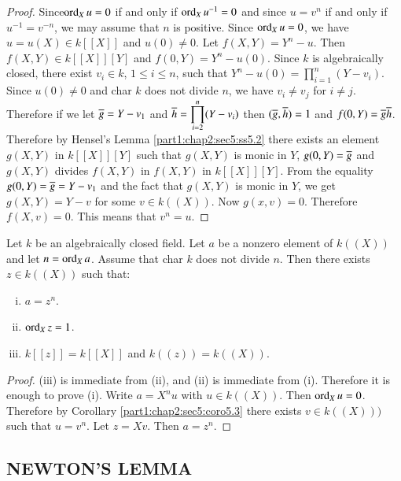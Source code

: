 \begin{proof}
  Since\pageoriginale $\operatorname{ord}_X u =0$ if and only if $\operatorname{ord}_X u^{-1}=0$ and since $u= v^n$ if and only if $u^{-1} = v^{-n}$, we may assume that $n$ is positive. Since $\operatorname{ord}_X u=0$, we have $u = u(X) \in k [[X]]$ and $u (0) \neq 0$. Let $f(X, Y) = Y^n-u$. Then $f(X, Y) \in k [[X]][Y]$ and $f (0, Y)= Y^n- u(0)$. Since $k$ is algebraically closed, there exist $v_i \in k$, $1 \leq i \leq n$, such that $\displaystyle{Y^n - u(0)=\prod^n_{i=1} (Y- v_i)}$. Since $u(0) \neq 0$ and char $k$ does not divide $n$, we have $v_i \neq v_j$ for $i \neq j$. Therefore if we let $\overline{g} = Y -v_1$ and $\overline{h} = \displaystyle{\prod^n_{i=2} (Y- v_i)}$ then \gcd $(\overline{g}, \overline{h})=1$ and $f(0, Y)= \overline{g} \overline{h}$. Therefore by Hensel's Lemma \ref{part1:chap2:sec5:ss5.2} there exists an element $g(X, Y)$  in $k [[X]] [Y]$ such that $g (X, Y)$ is monic in $Y$, $g (0 , Y) = \overline{g}$ and $g(X, Y)$ divides $f(X, Y)$ in $f (X, Y)$ in $k [[X]] [Y]$. From the equality $g (0 , Y)= \overline{g} = Y- v_1$ and the fact that $g(X, Y)$ is monic in $Y$, we get $g(X, Y)= Y - v$ for some $v \in k ((X))$. Now $g(x, v)=0$. Therefore $f(X, v)=0$. This means that $v^n =u$.
\end{proof}

\begin{coro}\label{part1:chap2:sec5:coro5.4}
  Let $k$ be an algebraically closed field. Let $a$ be a nonzero element of $k((X))$ and let $n= \operatorname{ord}_X a$. Assume that char $k$ does not divide $n$. Then there exists $z \in k ((X))$ such that:
\begin{enumerate}[(i)]
\item $a= z^n$.
\item $\operatorname{ord}_X z=1$.
\item $k[[z]]= k[[X]]$ and $k((z))= k ((X))$.
\end{enumerate}
\end{coro}

\begin{proof}
  (iii) is immediate from (ii), and (ii) is immediate from (i). Therefore it is enough to prove (i). Write $a= X^n u$ with $u \in k ((X))$. Then $\operatorname{ord}_X u =0$. Therefore by Corollary \ref{part1:chap2:sec5:coro5.3} there exists $v \in k ((X)))$ such that $u = v^n$. Let $z= X v$. Then $a= z^n$.
\end{proof}

\setcounter{subsection}{4}
\setcounter{mysubsection}{4}
\subsection{NEWTON'S LEMMA}\label{part1:chap2:sec5:ss5.5}

